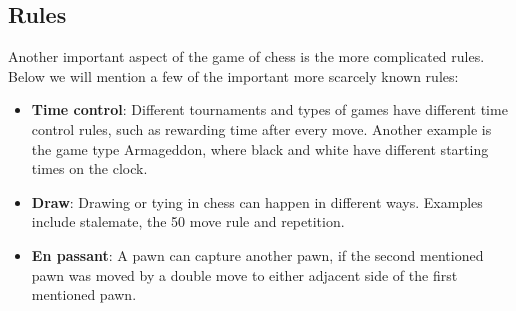 
\subsection{Rules}\label{subsec:rules}

Another important aspect of the game of chess is the more complicated rules.
Below we will mention a few of the important more scarcely known rules:

\begin{itemize}
    \item \textbf{Time control}: Different tournaments and types of games have different time control rules, such as
    rewarding time after every move.
    Another example is the game type Armageddon, where black and white have different starting times on the clock.
    \cite{schiller2012}
    \item \textbf{Draw}: Drawing or tying in chess can happen in different ways.
    Examples include stalemate, the 50 move rule and repetition. \cite{schiller2012}
    \item \textbf{En passant}: A pawn can capture another pawn, if the second mentioned pawn was moved by a double move
    to either adjacent side of the first mentioned pawn. \cite{schiller2012}
\end{itemize}

